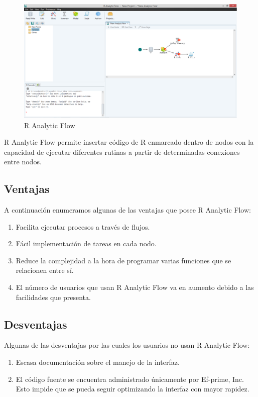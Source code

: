 \documentclass[11pt,a4paper,oneside]{book}\usepackage[]{graphicx}\usepackage[]{color}
\begin{document}
\begin{itemize}
\begin{figure}[H]
\centering
\includegraphics[scale=.35]{figuras/ranalyticflow.eps}
\caption{R Analytic Flow}
\label{RAF}
\end{figure}

R Analytic Flow permite insertar código de R enmarcado dentro de nodos con la capacidad de ejecutar diferentes rutinas a partir de determinadas conexiones entre nodos.

\subsection{Ventajas}

A continuación enumeramos algunas de las ventajas que posee R Analytic Flow:
\begin{enumerate}
   \item Facilita ejecutar procesos a través de flujos.
   \item Fácil implementación de tareas en cada nodo.
   \item Reduce la complejidad a la hora de programar varias funciones que se relacionen entre sí.
   \item El número de usuarios que usan R Analytic Flow va en aumento debido a las facilidades que presenta.
\end{enumerate}

\subsection{Desventajas}

Algunas de las desventajas por las cuales los usuarios no usan R Analytic Flow:
\begin{enumerate}
   \item Escasa documentación sobre el manejo de la interfaz.
   \item El código fuente se encuentra administrado únicamente por Ef-prime, Inc. Esto impide que se pueda seguir optimizando la interfaz con mayor rapidez.
\end{enumerate}



\end{itemize}
\end{document}
